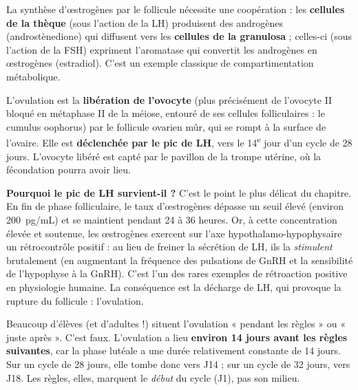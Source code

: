 \documentclass[11pt]{article}
\newcommand{\cle}[1]{{\popxbold\color{popdark}#1}}
\newcounter{popsec}
\newcounter{popsub}
\newcommand{\courssub}[1]{%
  \stepcounter{popsub}%
  \par\vspace{9pt}\noindent{\popxbold\fontsize{11.5}{13}\selectfont\color{popink}{\color{poporange}\thepopsec.\thepopsub}\hspace{6pt}#1}\par\nopagebreak\vspace{4pt}
}
\begin{document}
\begin{savaistu}
La synthèse d'œstrogènes par le follicule nécessite une coopération : les \textbf{cellules de la thèque} (sous l'action de la LH) produisent des androgènes (androstènedione) qui diffusent vers les \textbf{cellules de la granulosa} ; celles-ci (sous l'action de la FSH) expriment l'aromatase qui convertit les androgènes en œstrogènes (estradiol). C'est un exemple classique de compartimentation métabolique.
\end{savaistu}

\courssub{Le pic de LH et l'ovulation (vers J14)}

\begin{definition}[Ovulation]
L'\cle{ovulation} est la \textbf{libération de l'ovocyte} (plus précisément de l'ovocyte II bloqué en métaphase II de la méiose, entouré de ses cellules folliculaires : le cumulus oophorus) par le follicule ovarien mûr, qui se rompt à la surface de l'ovaire. Elle est \textbf{déclenchée par le pic de LH}, vers le 14\textsuperscript{e} jour d'un cycle de 28 jours. L'ovocyte libéré est capté par le pavillon de la trompe utérine, où la fécondation pourra avoir lieu.
\end{definition}

\textbf{Pourquoi le pic de LH survient-il ?} C'est le point le plus délicat du chapitre. En fin de phase folliculaire, le taux d'œstrogènes dépasse un seuil élevé (environ \SI{200}{pg/mL}) et se maintient pendant 24 à 36 heures. Or, à cette concentration élevée et soutenue, les œstrogènes exercent sur l'axe hypothalamo-hypophysaire un \cle{rétrocontrôle positif} : au lieu de freiner la sécrétion de LH, ils la \emph{stimulent} brutalement (en augmentant la fréquence des pulsations de GnRH et la sensibilité de l'hypophyse à la GnRH). C'est l'un des rares exemples de rétroaction positive en physiologie humaine. La conséquence est la décharge de LH, qui provoque la rupture du follicule : l'ovulation.

\begin{attention}
Beaucoup d'élèves (et d'adultes !) situent l'ovulation « pendant les règles » ou « juste après ». C'est faux. L'ovulation a lieu \textbf{environ 14 jours avant les règles suivantes}, car la phase lutéale a une durée relativement constante de 14 jours. Sur un cycle de 28 jours, elle tombe donc vers J14 ; sur un cycle de 32 jours, vers J18. Les règles, elles, marquent le \emph{début} du cycle (J1), pas son milieu.
\end{attention}
\end{document}
